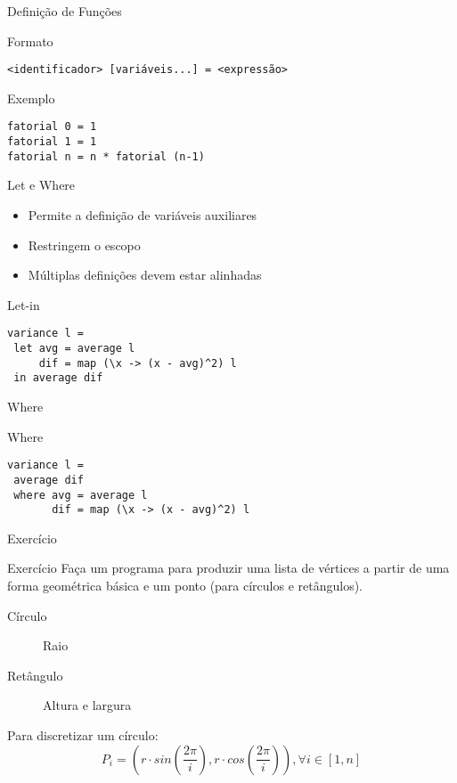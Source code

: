 \documentclass{beamer}
\begin{document}
		\begin{frame}[fragile]{Definição de Funções}
		 \begin{block}{Formato}
		  \begin{lstlisting}
<identificador> [variáveis...] = <expressão>
		  \end{lstlisting}
		 \end{block}
		 
		 \begin{block}{Exemplo}
		  \begin{lstlisting}
fatorial 0 = 1
fatorial 1 = 1
fatorial n = n * fatorial (n-1)
		  \end{lstlisting}
		 \end{block}
		\end{frame}
		
		\begin{frame}[fragile]{Let e Where}
		 \begin{itemize}
		  \item Permite a definição de variáveis auxiliares
		  \item Restringem o escopo
		  \item Múltiplas definições devem estar alinhadas
		 \end{itemize}
		 \begin{block}{Let-in}
		  \begin{lstlisting}
variance l =
 let avg = average l
     dif = map (\x -> (x - avg)^2) l
 in average dif
		  \end{lstlisting}	  
		 \end{block}
		\end{frame}
		
		\begin{frame}[fragile]{Where}
		 \begin{block}{Where}
		  \begin{lstlisting}
variance l =
 average dif
 where avg = average l
       dif = map (\x -> (x - avg)^2) l
		  \end{lstlisting}
		 \end{block}		 
		\end{frame}
		
		\begin{frame}{Exercício}
		 \begin{block}{Exercício}
		  Faça um programa para produzir uma lista de vértices a partir de uma forma geométrica básica e um ponto (para círculos e retângulos).
		 \end{block}
		 \begin{description}
		  \item [Círculo] Raio
		  \item [Retângulo] Altura e largura
		 \end{description}
		 Para discretizar um círculo:
		 \[
		  P_i = ( r \cdot sin(\frac{2 \pi}{i}) , r \cdot cos(\frac{2 \pi}{i} ) ) , \forall i \in [1,n]
		 \]


		\end{frame}
		
\end{document}

